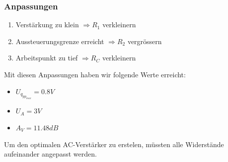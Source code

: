 \begin{frame}
	\frametitle{Anpassungen}
	\begin{enumerate}
		\item Verstärkung zu klein $\Rightarrow R_1$ verkleinern 
		\item Aussteuerungsgrenze erreicht $\Rightarrow R_2$ vergrössern
		\item Arbeitspunkt zu tief $\Rightarrow R_C$ verkleinern
	\end{enumerate}
	Mit diesen Anpassungen haben wir folgende Werte erreicht:
	\begin{itemize}
		\item $U_{q_{pp_{max}}} = 0.8V$
		\item $U_A = 3V$
		\item $A_V = 11.48dB$
	\end{itemize}
	Um den optimalen AC-Verstärker zu erstelen, müssten alle Widerstände
	aufeinander angepasst werden.
\end{frame}
